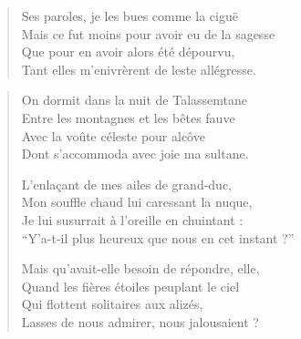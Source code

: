 \begin{verse}
Ses paroles, je les bues comme la ciguë\\
Mais ce fut moins pour avoir eu de la sagesse\\
Que pour en avoir alors été dépourvu,\\
Tant elles m’enivrèrent de leste allégresse.
\end{verse}


\begin{verse}
On dormit dans la nuit de Talassemtane\\
Entre les montagnes et les bêtes fauve\\
Avec la voûte céleste pour alcôve\\
Dont s’accommoda avec joie ma sultane.

L’enlaçant de mes ailes de grand-duc,\\
Mon souffle chaud lui caressant la nuque,\\
Je lui susurrait à l’oreille en chuintant :\\
\enquote{Y’a-t-il plus heureux que nous en cet instant ?}

Mais qu’avait-elle besoin de répondre, elle,\\
Quand les fières étoiles peuplant le ciel\\
Qui flottent solitaires aux alizés,\\
Lasses de nous admirer, nous jalousaient ?
\end{verse}


